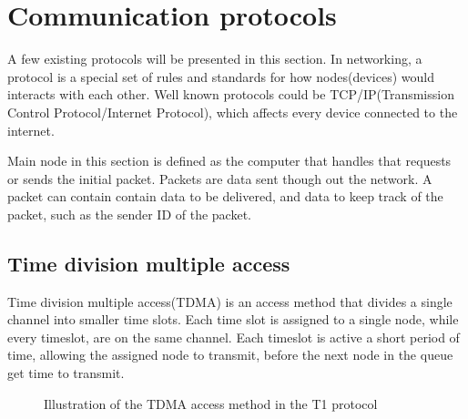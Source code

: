 \section{Communication protocols} \label{cha:comprot}
A few existing protocols will be presented in this section.
In networking, a protocol is a special set of rules and standards for how nodes(devices) would interacts with each other\cite{Protocol_difinition}.
Well known protocols could be TCP/IP(Transmission Control Protocol/Internet Protocol), which affects every device connected to the internet.

Main node in this section is defined as the computer that handles that requests or sends the initial packet.
Packets are data sent though out the network. A packet can contain contain data to be delivered, and data to keep track of the packet, such as the sender ID of the packet.

\subsection{Time division multiple access}
Time division multiple access(TDMA) is an access method that divides a single channel into smaller time slots.
Each time slot is assigned to a single node, while every timeslot, are on the same channel.
Each timeslot is active a short period of time, allowing the assigned node to transmit, before the next node in the queue get time to transmit\cite{TDMA}.

\begin{figure}[!h]
	\centering
	\caption{Illustration of the TDMA access method in the T1 protocol\cite{TDMA}}
	\label{fig:TDMAfigure}
\end{figure}

